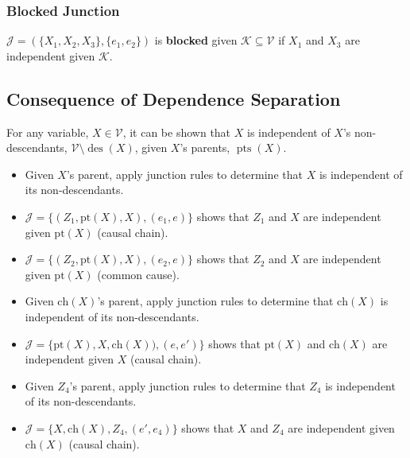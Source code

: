 \subsubsection{Blocked Junction}
\begin{definition}
    $\mathcal{J} = (\{X_1, X_2, X_3\}, \{e_1, e_2\})$ is \textbf{blocked} given $\mathcal{K} \subseteq \mathcal{V}$ if $X_1$ and $X_3$ are independent given $\mathcal{K}$.
\end{definition}

\subsection{Consequence of Dependence Separation}
\begin{theorem}
    For any variable, $X \in \mathcal{V}$, it can be shown that $X$ is independent of $X$'s non-descendants, $\mathcal{V} \setminus \operatorname{des}(X)$, given $X$'s parents, $\operatorname{pts}(X)$.
\end{theorem}

\begin{notes}
    \begin{itemize}
        \item Given $X$'s parent, apply junction rules to determine that $X$ is independent of its non-descendants.
        \item $\mathcal{J} = \{(Z_1, \text{pt}(X), X), (e_1,e)\}$ shows that $Z_1$ and $X$ are independent given $\text{pt}(X)$ (causal chain).
        \item $\mathcal{J} = \{(Z_2, \text{pt}(X), X), (e_2,e)\}$ shows that $Z_2$ and $X$ are independent given $\text{pt}(X)$ (common cause).
        \item Given $\text{ch}(X)$'s parent, apply junction rules to determine that $\text{ch}(X)$ is independent of its non-descendants.
        \item $\mathcal{J} = \{\text{pt}(X),X, \text{ch}(X)), (e,e')\}$ shows that $\text{pt}(X)$ and $\text{ch}(X)$ are independent given $X$ (causal chain).
        \item Given $Z_4$'s parent, apply junction rules to determine that $Z_4$ is independent of its non-descendants.
        \item $\mathcal{J} = \{X, \text{ch}(X), Z_4, (e',e_4)\}$ shows that $X$ and $Z_4$ are independent given $\text{ch}(X)$ (causal chain).
    \end{itemize}
\end{notes}

